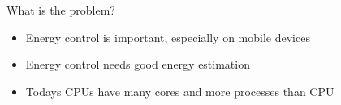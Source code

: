 
What is the problem?

\begin{itemize}

\item Energy control is important, especially on mobile devices

\item Energy control needs good energy estimation

\item Todays CPUs have many cores and more processes than CPU

\end{itemize}

